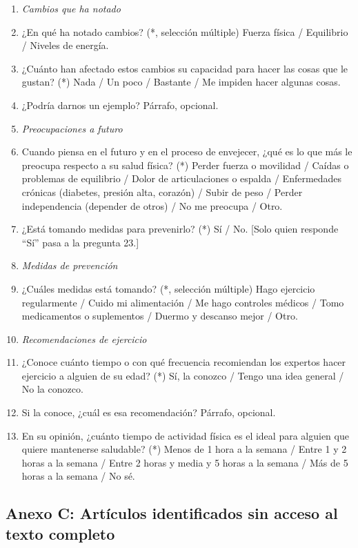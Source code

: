 \documentclass[12pt, letterpaper, table, xcdraw]{extarticle}
\begin{document}
{\begin{enumerate}[leftmargin=2em, itemsep=0.4em]
    \item[] \textit{Cambios que ha notado}
    \item ¿En qué ha notado cambios? (*, selección múltiple) Fuerza física / Equilibrio / Niveles de energía.
    \item ¿Cuánto han afectado estos cambios su capacidad para hacer las cosas que le gustan? (*) Nada / Un poco / Bastante / Me impiden hacer algunas cosas.
    \item ¿Podría darnos un ejemplo? Párrafo, opcional.

    \item[] \textit{Preocupaciones a futuro}
    \item Cuando piensa en el futuro y en el proceso de envejecer, ¿qué es lo que más le preocupa respecto a su salud física? (*) Perder fuerza o movilidad / Caídas o problemas de equilibrio / Dolor de articulaciones o espalda / Enfermedades crónicas (diabetes, presión alta, corazón) / Subir de peso / Perder independencia (depender de otros) / No me preocupa / Otro.
    \item ¿Está tomando medidas para prevenirlo? (*) Sí / No. [Solo quien responde ``Sí'' pasa a la pregunta 23.]

    \item[] \textit{Medidas de prevención}
    \item ¿Cuáles medidas está tomando? (*, selección múltiple) Hago ejercicio regularmente / Cuido mi alimentación / Me hago controles médicos / Tomo medicamentos o suplementos / Duermo y descanso mejor / Otro.

    \item[] \textit{Recomendaciones de ejercicio}
    \item ¿Conoce cuánto tiempo o con qué frecuencia recomiendan los expertos hacer ejercicio a alguien de su edad? (*) Sí, la conozco / Tengo una idea general / No la conozco.
    \item Si la conoce, ¿cuál es esa recomendación? Párrafo, opcional.
    \item En su opinión, ¿cuánto tiempo de actividad física es el ideal para alguien que quiere mantenerse saludable? (*) Menos de 1 hora a la semana / Entre 1 y 2 horas a la semana / Entre 2 horas y media y 5 horas a la semana / Más de 5 horas a la semana / No sé.
\end{enumerate}
}

{}
\subsection*{Anexo C: Artículos identificados sin acceso al texto completo}
\end{document}
